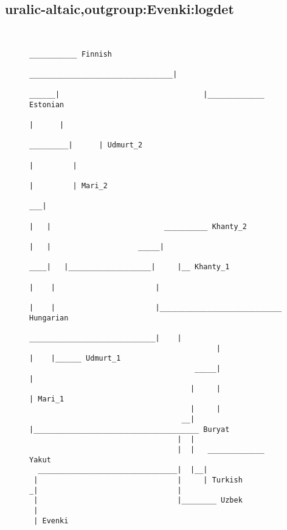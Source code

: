 \subsection{uralic-altaic,outgroup:Evenki:logdet}
\begin{figure}[H]
\begin{center}
{
\selectfont
\begin{verbatim}

                                                                                                                                      ___________ Finnish
                                                                                                    _________________________________|
                                                                                             ______|                                 |_____________ Estonian
                                                                                            |      |
                                                                                   _________|      | Udmurt_2
                                                                                  |         |
                                                                                  |         | Mari_2
                                                                               ___|
                                                                              |   |                          __________ Khanty_2
                                                                              |   |                    _____|
                                                                          ____|   |___________________|     |__ Khanty_1
                                                                         |    |                       |
                                                                         |    |                       |____________________________ Hungarian
                                            _____________________________|    |
                                           |                             |    |______ Udmurt_1
                                      _____|                             |
                                     |     |                             | Mari_1
                                     |     |
                                   __|     |______________________________________ Buryat
                                  |  |
                                  |  |   _____________ Yakut
  ________________________________|  |__|
 |                                |     | Turkish
_|                                |
 |                                |________ Uzbek
 |
 | Evenki



\end{verbatim}
}
\label{...}
\end{center}
\end{figure}
